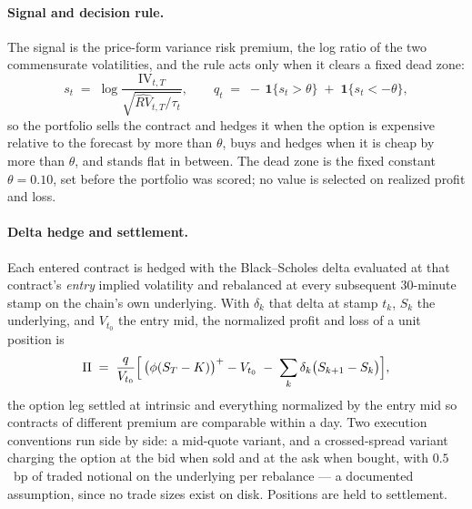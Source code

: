 \paragraph{Signal and decision rule.} The signal is the price-form
variance risk premium, the log ratio of the two commensurate
volatilities, and the rule acts only when it clears a fixed dead zone:
\begin{equation}
    s_t \;=\; \log \frac{\mathrm{IV}_{t,T}}
                        {\sqrt{\widehat{RV}_{t,T} / \tau_t}} ,
    \qquad
    q_t \;=\; -\,\mathbf{1}\{ s_t > \theta \}
              \;+\; \mathbf{1}\{ s_t < -\theta \},
    \label{eq:opt_signal}
\end{equation}
so the portfolio sells the contract and hedges it when the option is expensive
relative to the forecast by more than $\theta$, buys and hedges when it
is cheap by more than $\theta$, and stands flat in between. The dead zone
is the fixed constant $\theta = 0.10$, set before the portfolio was scored;
no value is selected on realized profit and loss.

\paragraph{Delta hedge and settlement.} Each entered contract is hedged
with the Black--Scholes delta evaluated at that contract's \emph{entry}
implied volatility and rebalanced at every subsequent 30-minute stamp on
the chain's own underlying. With $\delta_k$ that delta at stamp $t_k$,
$S_k$ the underlying, and $V_{t_0}$ the entry mid, the normalized profit
and loss of a unit position is
\begin{equation}
    \Pi \;=\; \frac{q}{V_{t_0}}
      \Bigl[\, \bigl(\phi (S_T - K)\bigr)^{+} - V_{t_0}
      \;-\; \sum_{k} \delta_k \bigl( S_{k+1} - S_k \bigr) \Bigr],
    \label{eq:opt_pnl}
\end{equation}
the option leg settled at intrinsic and everything normalized by the
entry mid so contracts of different premium are comparable within a day.
Two execution conventions run side by side: a mid-quote variant, and a
crossed-spread variant charging the option at the bid when sold and at the ask
when bought, with $0.5$~bp of traded notional on the underlying per
rebalance --- a documented assumption, since no trade sizes exist on
disk. Positions are held to settlement.

